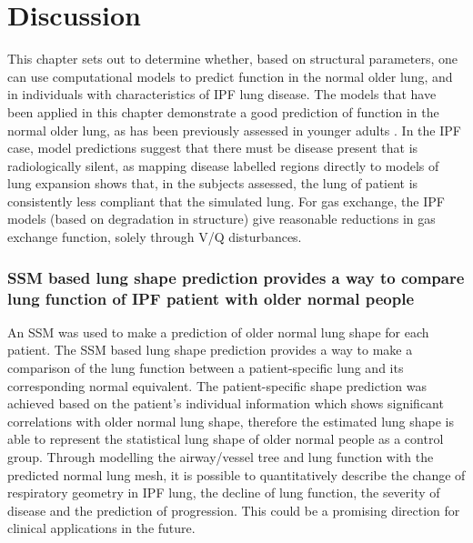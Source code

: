 \section{Discussion}
This chapter sets out to determine whether, based on structural parameters, one can use computational models to predict function in the normal older lung, and in individuals with characteristics of IPF lung disease. The models that have been applied in this chapter demonstrate a good prediction of function in the normal older lung, as has been previously assessed in younger adults \citep{tawhai2004ct, swan2012computational, clark2011interdependent}. In the IPF case, model predictions suggest that there must be disease present that is radiologically silent, as mapping disease labelled regions directly to models of lung expansion shows that, in the subjects assessed, the lung of patient is consistently less compliant that the simulated lung. For gas exchange, the IPF models (based on degradation in structure) give reasonable reductions in gas exchange function, solely through V/Q disturbances.

\subsubsection{SSM based lung shape prediction provides a way to compare lung function of IPF patient with older normal people}
An SSM was used to make a prediction of older normal lung shape for each patient. The SSM based lung shape prediction provides a way to make a comparison of the lung function between a patient-specific lung and its corresponding normal equivalent. The patient-specific shape prediction was achieved based on the patient's individual information which shows significant correlations with older normal lung shape, therefore the estimated lung shape is able to represent the statistical lung shape of older normal people as a control group. Through modelling the airway/vessel tree and lung function with the predicted normal lung mesh, it is possible to quantitatively describe the change of respiratory geometry in IPF lung, the decline of lung function, the severity of disease and the prediction of progression. This could be a promising direction for clinical applications in the future.

